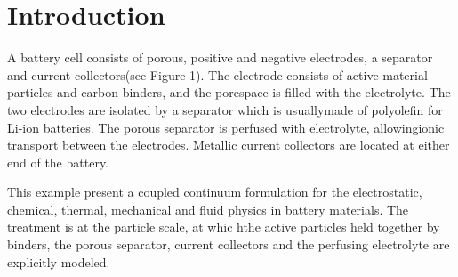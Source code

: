 \hypertarget{_intercalation_Introduction}{}\section{Introduction}\label{_intercalation_Introduction}
A battery cell consists of porous, positive and negative electrodes, a separator and current collectors(see Figure 1). The electrode consists of active-\/material particles and carbon-\/binders, and the porespace is filled with the electrolyte. The two electrodes are isolated by a separator which is usuallymade of polyolefin for Li-\/ion batteries. The porous separator is perfused with electrolyte, allowingionic transport between the electrodes. Metallic current collectors are located at either end of the battery.

This example present a coupled continuum formulation for the electrostatic, chemical, thermal, mechanical and fluid physics in battery materials. The treatment is at the particle scale, at whic hthe active particles held together by binders, the porous separator, current collectors and the perfusing electrolyte are explicitly modeled.


